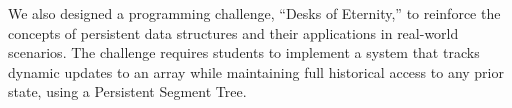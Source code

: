 \documentclass{fairmeta}
\numberwithin{equation}{section}
\begin{document}
We also designed a programming challenge, ``Desks of Eternity,'' to reinforce the concepts of persistent data structures and their applications in real-world scenarios. The challenge requires students to implement a system that tracks dynamic updates to an array while maintaining full historical access to any prior state, using a Persistent Segment Tree.



\appendix
\newpage






\end{document}
